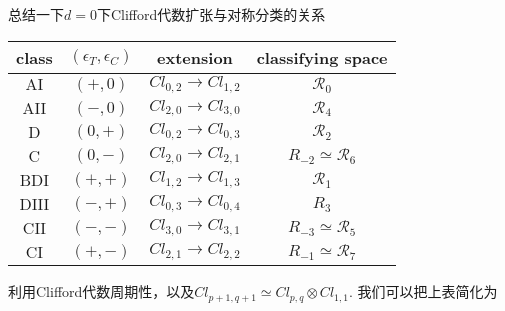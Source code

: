 \documentclass[a4paper]{article}
\numberwithin{equation}{subsection}
\begin{document}
总结一下$d=0$下Clifford代数扩张与对称分类的关系

\begin{table}[h]
    \centering
    \begin{tabular}{cccc}
        \hline \hline class & $\left(\epsilon_{T}, \epsilon_{C}\right)$ & extension & classifying space \\
        \hline $\mathrm{AI}$ & $(+, 0)$ & $Cl_{0,2} \rightarrow Cl_{1,2}$ & $\mathcal{R}_{0}$ \\
        $\mathrm{AII}$ & $(-, 0)$ & $Cl_{2,0} \rightarrow Cl_{3,0}$ & $\mathcal{R}_{4}$ \\
        \hline $\mathrm{D}$ & $(0,+)$ & $Cl_{0,2} \rightarrow Cl_{0,3}$ & $\mathcal{R}_{2}$ \\
        $\mathrm{C}$ & $(0,-)$ & $Cl_{2,0} \rightarrow Cl_{2,1}$ & $R_{-2} \simeq \mathcal{R}_{6}$ \\
        \hline $\mathrm{BDI}$ & $(+,+)$ & $Cl_{1,2} \rightarrow Cl_{1,3}$ & $\mathcal{R}_{1}$ \\
        $\mathrm{DIII}$ & $(-,+)$ & $Cl_{0,3} \rightarrow C l_{0,4}$ & $R_{3}$ \\
        $\mathrm{CII}$ & $(-,-)$ & $Cl_{3,0} \rightarrow Cl_{3,1}$ & $R_{-3} \simeq \mathcal{R}_{5}$ \\
        $\mathrm{CI}$ & $(+,-)$ & $Cl_{2,1} \rightarrow Cl_{2,2}$ & $R_{-1} \simeq \mathcal{R}_{7}$ \\
        \hline \hline
    \end{tabular}
\end{table}

利用Clifford代数周期性，以及$Cl_{p+1,q+1}\simeq Cl_{p,q}\otimes Cl_{1,1}$. 我们可以把上表简化为
\end{document}
